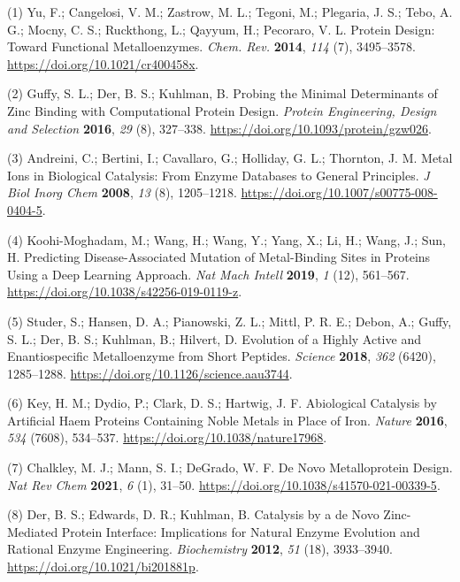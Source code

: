 \documentclass[ lineno,
  9pt]{elife}
\newenvironment{cslreferences}%
  {}%
  {\par}
\begin{document}
\hypertarget{refs}{}
\begin{cslreferences}
\leavevmode\hypertarget{ref-gxiv5uTU}{}%
(1) Yu, F.; Cangelosi, V. M.; Zastrow, M. L.; Tegoni, M.; Plegaria, J. S.; Tebo, A. G.; Mocny, C. S.; Ruckthong, L.; Qayyum, H.; Pecoraro, V. L. Protein Design: Toward Functional Metalloenzymes. \emph{Chem. Rev.} \textbf{2014}, \emph{114} (7), 3495--3578. \url{https://doi.org/10.1021/cr400458x}.

\leavevmode\hypertarget{ref-LY9UGI7}{}%
(2) Guffy, S. L.; Der, B. S.; Kuhlman, B. Probing the Minimal Determinants of Zinc Binding with Computational Protein Design. \emph{Protein Engineering, Design and Selection} \textbf{2016}, \emph{29} (8), 327--338. \url{https://doi.org/10.1093/protein/gzw026}.

\leavevmode\hypertarget{ref-iqbHG3rv}{}%
(3) Andreini, C.; Bertini, I.; Cavallaro, G.; Holliday, G. L.; Thornton, J. M. Metal Ions in Biological Catalysis: From Enzyme Databases to General Principles. \emph{J Biol Inorg Chem} \textbf{2008}, \emph{13} (8), 1205--1218. \url{https://doi.org/10.1007/s00775-008-0404-5}.

\leavevmode\hypertarget{ref-4sXp2sDw}{}%
(4) Koohi-Moghadam, M.; Wang, H.; Wang, Y.; Yang, X.; Li, H.; Wang, J.; Sun, H. Predicting Disease-Associated Mutation of Metal-Binding Sites in Proteins Using a Deep Learning Approach. \emph{Nat Mach Intell} \textbf{2019}, \emph{1} (12), 561--567. \url{https://doi.org/10.1038/s42256-019-0119-z}.

\leavevmode\hypertarget{ref-oOm5j05D}{}%
(5) Studer, S.; Hansen, D. A.; Pianowski, Z. L.; Mittl, P. R. E.; Debon, A.; Guffy, S. L.; Der, B. S.; Kuhlman, B.; Hilvert, D. Evolution of a Highly Active and Enantiospecific Metalloenzyme from Short Peptides. \emph{Science} \textbf{2018}, \emph{362} (6420), 1285--1288. \url{https://doi.org/10.1126/science.aau3744}.

\leavevmode\hypertarget{ref-LAjO1aDL}{}%
(6) Key, H. M.; Dydio, P.; Clark, D. S.; Hartwig, J. F. Abiological Catalysis by Artificial Haem Proteins Containing Noble Metals in Place of Iron. \emph{Nature} \textbf{2016}, \emph{534} (7608), 534--537. \url{https://doi.org/10.1038/nature17968}.

\leavevmode\hypertarget{ref-13w4SiWCx}{}%
(7) Chalkley, M. J.; Mann, S. I.; DeGrado, W. F. De Novo Metalloprotein Design. \emph{Nat Rev Chem} \textbf{2021}, \emph{6} (1), 31--50. \url{https://doi.org/10.1038/s41570-021-00339-5}.

\leavevmode\hypertarget{ref-khOeAdye}{}%
(8) Der, B. S.; Edwards, D. R.; Kuhlman, B. Catalysis by a de Novo Zinc-Mediated Protein Interface: Implications for Natural Enzyme Evolution and Rational Enzyme Engineering. \emph{Biochemistry} \textbf{2012}, \emph{51} (18), 3933--3940. \url{https://doi.org/10.1021/bi201881p}.


\end{cslreferences}
\end{document}
